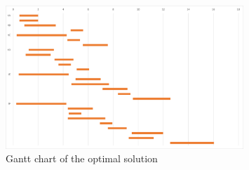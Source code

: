 \begin{figure}[htb]
\includegraphics[width=0.8\textwidth]{figure/fig-toy.png}
\centering
\caption{Gantt chart of the optimal solution} \label{fig-toy}
\end{figure}